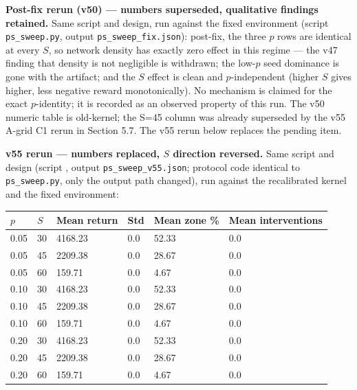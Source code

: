 \documentclass[11pt]{article}
\begin{document}
\textbf{Post-fix rerun (v50) --- numbers superseded, qualitative findings retained.} Same script and design, run against the fixed environment (script \texttt{ps\_sweep.py}, output \texttt{ps\_sweep\_fix.json}): post-fix, the three $p$ rows are identical at every $S$, so network density has exactly zero effect in this regime --- the v47 finding that density is not negligible is withdrawn; the low-$p$ seed dominance is gone with the artifact; and the $S$ effect is clean and $p$-independent (higher $S$ gives higher, less negative reward monotonically). No mechanism is claimed for the exact $p$-identity; it is recorded as an observed property of this run. The v50 numeric table is old-kernel; the S=45 column was already superseded by the v55 A-grid C1 rerun in Section 5.7. The v55 rerun below replaces the pending item.

\textbf{v55 rerun --- numbers replaced, $S$ direction reversed.} Same script and design (script , output \texttt{ps\_sweep\_v55.json}; protocol code identical to \texttt{ps\_sweep.py}, only the output path changed), run against the recalibrated kernel and the fixed environment:

\begin{table}[htbp]
\centering
\begin{tabular}{llllll}
\toprule
\textbf{$p$} & \textbf{$S$} & \textbf{Mean return} & \textbf{Std} & \textbf{Mean zone \%} & \textbf{Mean interventions} \\
\midrule
0.05 & 30 & 4168.23 & 0.0 & 52.33 & 0.0 \\
0.05 & 45 & 2209.38 & 0.0 & 28.67 & 0.0 \\
0.05 & 60 & 159.71 & 0.0 & 4.67 & 0.0 \\
0.10 & 30 & 4168.23 & 0.0 & 52.33 & 0.0 \\
0.10 & 45 & 2209.38 & 0.0 & 28.67 & 0.0 \\
0.10 & 60 & 159.71 & 0.0 & 4.67 & 0.0 \\
0.20 & 30 & 4168.23 & 0.0 & 52.33 & 0.0 \\
0.20 & 45 & 2209.38 & 0.0 & 28.67 & 0.0 \\
0.20 & 60 & 159.71 & 0.0 & 4.67 & 0.0 \\
\bottomrule
\end{tabular}
\end{table}
\end{document}

